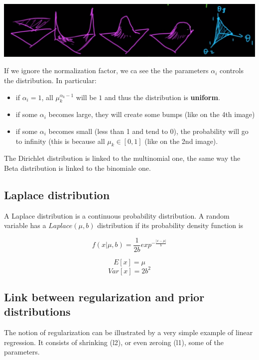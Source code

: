 \includegraphics[scale=0.25]{content/Dirichlet_distribution.png}


If we ignore the normalization factor, we ca see the the parameters $\alpha_i$ controls the distribution. In particular:
\begin{itemize}
    \item if $\alpha_i = 1$, all $\mu_k^{\alpha_k-1}$ will be $1$ and thus the distribution is \textbf{uniform}.
    \item if some $\alpha_i$ becomes large, they will create some bumps (like on the 4th image)
    \item if some $\alpha_i$ becomes small (less than 1 and tend to 0), the probability will go to infinity (this is because all $\mu_k \in [0, 1]$ (like on the 2nd image).
\end{itemize}


The Dirichlet distribution is linked to the multinomial one, the same way the Beta distribution is linked to the binomiale one.

\subsection{Laplace distribution}
A Laplace distribution is a continuous probability distribution.
A random variable has a $Laplace(\mu, b)$ distribution if its probability density function is

\begin{equation}
    f(x|\mu, b) = \frac{1}{2b}exp^{-\frac{|x-\mu|}{b}}
\end{equation}

\begin{equation}
    E[x] = \mu
\end{equation}
\begin{equation}
    Var[x] = 2b^2
\end{equation}

\subsection{Link between regularization and prior distributions}
The notion of regularization can be illustrated by a very simple example of linear regression. It consists of shrinking (l2), or even zeroing (l1), some of the parameters.


